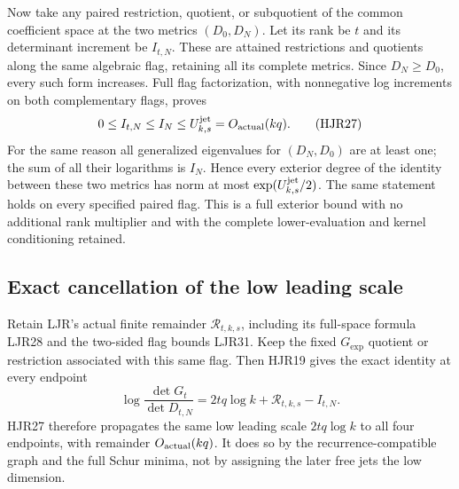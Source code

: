 \documentclass[11pt,a4paper]{article}
\begin{document}
Now take any paired restriction, quotient, or subquotient
of the common coefficient space at the two metrics
$(D_0,D_N)$. Let its rank be $t$ and its determinant
increment be $I_{t,N}$. These are attained restrictions
and quotients along the same algebraic flag, retaining
all its complete metrics. Since $D_N\ge D_0$, every
such form increases. Full flag factorization, with
nonnegative log increments on both complementary flags,
proves
\[
 0\le I_{t,N}\le I_N\le U_{k,s}^{\rm jet}=O_{\rm actual}(kq).
 \tag{HJR27}
\]
For the same reason all generalized eigenvalues for
$(D_N,D_0)$ are at least one; the sum of all their
logarithms is $I_N$. Hence every exterior degree of the
identity between these two metrics has norm at most
$\exp(U_{k,s}^{\rm jet}/2)$. The same statement holds
on every specified paired flag. This is a full exterior
bound with no additional rank multiplier and with the
complete lower-evaluation and kernel conditioning retained.

\subsection{Exact cancellation of the low leading scale}

Retain LJR's actual finite remainder $\mathscr R_{t,k,s}$,
including its full-space formula LJR28 and the two-sided
flag bounds LJR31. Keep the fixed $G_{\exp}$ quotient
or restriction associated with this same flag.
Then HJR19 gives the exact identity at every endpoint
\[
 \log\frac{\det G_t}{\det D_{t,N}}
       =2tq\log k+\mathscr R_{t,k,s}-I_{t,N}.
 \tag{HJR28}
\]
HJR27 therefore propagates the same low leading scale
$2tq\log k$ to all four endpoints, with remainder
$O_{\rm actual}(kq)$. It does so by the recurrence-compatible
graph and the full Schur minima, not by assigning the
later free jets the low dimension.
\end{document}
